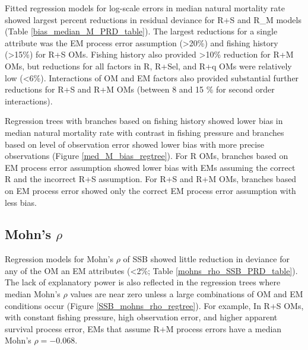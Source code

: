 \documentclass[
  12pt,
]{article}
\begin{document}
Fitted regression models for log-scale errors in median natural
mortality rate showed largest percent reductions in residual deviance
for R+S and R\_M models (Table \ref{bias_median_M_PRD_table}). The
largest reductions for a single attribute was the EM process error
assumption (\textgreater20\%) and fishing history (\textgreater15\%) for
R+S OMs. Fishing history also provided \textgreater10\% reduction for
R+M OMs, but reductions for all factors in R, R+Sel, and R+q OMs were
relatively low (\textless6\%). Interactions of OM and EM factors also
provided substantial further reductions for R+S and R+M OMs (between 8
and 15 \% for second order interactions).

Regression trees with branches based on fishing history showed lower
bias in median natural mortality rate with contrast in fishing pressure
and branches based on level of observation error showed lower bias with
more precise observations (Figure \ref{med_M_bias_regtree}). For R OMs,
branches based on EM process error assumption showed lower bias with EMs
assuming the correct R and the incorrect R+S assumption. For R+S and R+M
OMs, branches based on EM process error showed only the correct EM
process error assumption with less bias.

\subsection*{\texorpdfstring{Mohn's
\(\rho\)}{Mohn's \textbackslash rho}}\label{mohns-rho-1}

Regression models for Mohn's \(\rho\) of SSB showed little reduction in
deviance for any of the OM an EM attributes (\textless2\%; Table
\ref{mohns_rho_SSB_PRD_table}). The lack of explanatory power is also
reflected in the regression trees where median Mohn's \(\rho\) values
are near zero unless a large combinations of OM and EM conditions occur
(Figure \ref{SSB_mohns_rho_regtree}). For example, In R+S OMs, with
constant fishing pressure, high observation error, and higher apparent
survival process error, EMs that assume R+M process errors have a median
Mohn's \(\rho = -0.068\).
\end{document}
